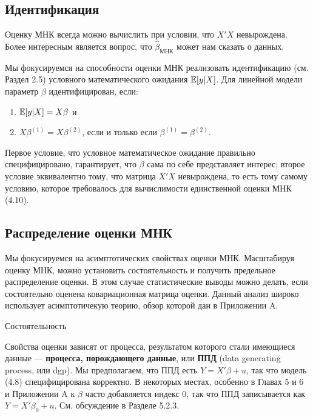 \subsection{Идентификация}

Оценку МНК всегда можно вычислить при условии, что $X'X$ невырождена. Более интересным является вопрос, что $\hat{\beta}_{\text{МНК}}$ может нам сказать о данных.

Мы фокусируемся на способности оценки МНК реализовать идентификацию (см. Раздел 2.5) условного математического ожидания $\mathbb{E}[y|X]$. Для линейной модели параметр $\beta$ идентифицирован, если:
\begin{enumerate}
\item $\mathbb{E}{[y|X]}=X\beta$ и
\item $X\beta^{(1)}=X\beta^{(2)}$, если и только если $\beta^{(1)}=\beta^{(2)}$.
\end{enumerate}
Первое условие, что условное математическое ожидание правильно специфицировано, гарантирует, что $\beta$ сама по себе представляет интерес; второе условие эквивалентно тому, что матрица $X'X$ невырождена, то есть тому самому условию, которое требовалось для вычислимости единственной оценки МНК (4.10).

\subsection{Распределение оценки МНК}
Мы фокусируемся на асимптотических свойствах оценки МНК. Масштабируя оценку МНК, можно установить состоятельность и получить предельное распределение оценки. В этом случае статистические выводы можно делать, если состоятельно оценена ковариационная матрица оценки. Данный анализ широко использует асимптотичекую теорию, обзор которой дан в Приложении A.

\begin{center}
Состоятельность
\end{center}

Свойства оценки зависят от процесса, результатом которого стали имеющиеся данные --- \textbf{процесса, порождающего данные}, или \textbf{ППД} (data generating process, или dgp). Мы предполагаем, что ППД есть $Y = X'\beta + u$, так что модель (4.8) специфицирована корректно. В некоторых местах, особенно в Главах 5 и 6 и Приложении A к $\beta$ часто добавляется индекс $0$, так что ППД записывается как  $Y = X'\beta_0 + u$. См. обсуждение в Разделе 5.2.3.

